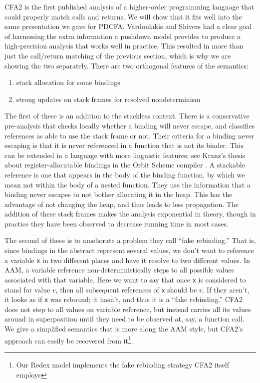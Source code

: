 \documentclass{llncs}
\begin{document}
CFA2 is the first published analysis of a higher-order programming
language that could properly match calls and returns. We will show
that it fits well into the same presentation we gave for
PDCFA. Vardoulakis and Shivers had a clear goal of harnessing the
extra information a pushdown model provides to produce a
high-precision analysis that works well in practice. This resulted in
more than just the call/return matching of the previous section, which
is why we are showing the two separately. There are two orthogonal
features of the semantics:
\begin{enumerate}
\item{stack allocation for some bindings}
\item{strong updates on stack frames for resolved nondeterminism}
\end{enumerate}
The first of these is an addition to the stackless context. There is a
conservative pre-analysis that checks locally whether a binding will
never escape, and classifies references as able to use the stack frame
or not. Their criteria for a binding never escaping is that it is
never referenced in a function that is not its binder. This can be
extended in a language with more linguistic features; see Kranz's
thesis about register-allocatable bindings in the Orbit Scheme
compiler \citep{ianjohnson:kranz:thesis:1988}. A stackable reference
is one that appears in the body of the binding function, by which we
mean not within the body of a nested function. They use the information
that a binding never escapes to not bother allocating it in the
heap. This has the advantage of not changing the heap, and thus leads
to less propagation. The addition of these stack frames makes the
analysis exponential in theory, though in practice they have been
observed to decrease running time in most cases.

The second of these is to ameliorate a problem they call ``fake
rebinding.'' That is, since bindings in the abstract represent several
values, we don't want to reference a variable \texttt{x} in two
different places and have it resolve to two different values. In AAM,
a variable reference non-deterministically steps to all possible
values associated with that variable. Here we want to say that once
\texttt{x} is considered to stand for value $v$, then all subsequent
references of \texttt{x} should be $v$. If they aren't, it looks as if
\texttt{x} was rebound; it hasn't, and thus it is a ``fake
rebinding.'' CFA2 does not step to all values on variable reference,
but instead carries all its values around in superposition until they
need to be observed at, say, a function call. We give a simplified
semantics that is more along the AAM style, but CFA2's approach can
easily be recovered from it\footnote{Our Redex model implements the fake rebinding strategy CFA2 itself employs}.
\end{document}
